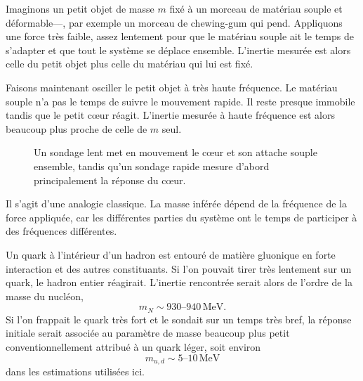 Imaginons un petit objet de masse \(m\) fixé à un morceau de matériau souple et déformable---, par exemple un morceau de chewing-gum qui pend. Appliquons une force très faible, assez lentement pour que le matériau souple ait le temps de s’adapter et que tout le système se déplace ensemble. L’inertie mesurée est alors celle du petit objet plus celle du matériau qui lui est fixé.

Faisons maintenant osciller le petit objet à très haute fréquence. Le matériau souple n’a pas le temps de suivre le mouvement rapide. Il reste presque immobile tandis que le petit cœur réagit. L’inertie mesurée à haute fréquence est alors beaucoup plus proche de celle de \(m\) seul.

\begin{figure}[h]
\centering
{}
\caption{Un sondage lent met en mouvement le cœur et son attache souple ensemble, tandis qu’un sondage rapide mesure d’abord principalement la réponse du cœur.}
\end{figure}

Il s’agit d’une analogie classique. La masse inférée dépend de la fréquence de la force appliquée, car les différentes parties du système ont le temps de participer à des fréquences différentes.

Un quark à l’intérieur d’un hadron est entouré de matière gluonique en forte interaction et des autres constituants. Si l’on pouvait tirer très lentement sur un quark, le hadron entier réagirait. L’inertie rencontrée serait alors de l’ordre de la masse du nucléon,
\begin{equation}
m_N\sim930\text{--}940\,\mathrm{MeV}.
\end{equation}
Si l’on frappait le quark très fort et le sondait sur un temps très bref, la réponse initiale serait associée au paramètre de masse beaucoup plus petit conventionnellement attribué à un quark léger, soit environ
\begin{equation}
m_{u,d}\sim5\text{--}10\,\mathrm{MeV}
\end{equation}
dans les estimations utilisées ici.

